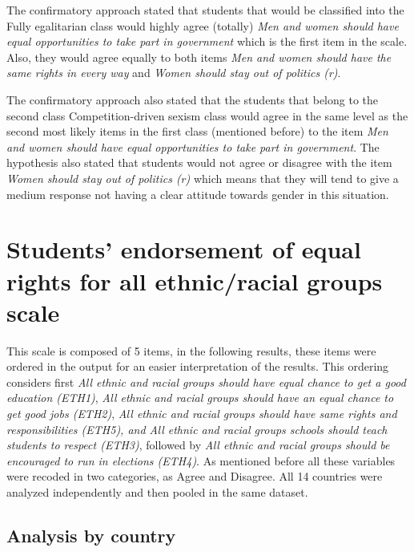 \documentclass[12pt,a4paper,oneside]{reedthesis}
\begin{document}
The confirmatory approach stated that students that would be classified into the Fully egalitarian class would highly agree (totally) \emph{Men and women should have equal opportunities to take part in government} which is the first item in the scale. Also, they would agree equally to both items \emph{Men and women should have the same rights in every way} and \emph{Women should stay out of politics (r)}.

The confirmatory approach also stated that the students that belong to the second class Competition-driven sexism class would agree in the same level as the second most likely items in the first class (mentioned before) to the item \emph{Men and women should have equal opportunities to take part in government}. The hypothesis also stated that students would not agree or disagree with the item \emph{Women should stay out of politics (r)} which means that they will tend to give a medium response not having a clear attitude towards gender in this situation.

\hypertarget{students-endorsement-of-equal-rights-for-all-ethnicracial-groups-scale}{%
\section{Students' endorsement of equal rights for all ethnic/racial groups scale}\label{students-endorsement-of-equal-rights-for-all-ethnicracial-groups-scale}}

This scale is composed of 5 items, in the following results, these items were ordered in the output for an easier interpretation of the results. This ordering considers first \emph{All ethnic and racial groups should have equal chance to get a good education (ETH1)}, \emph{All ethnic and racial groups should have an equal chance to get good jobs (ETH2)}, \emph{All ethnic and racial groups should have same rights and responsibilities (ETH5), and All ethnic and racial groups schools should teach students to respect (ETH3)}, followed by \emph{All ethnic and racial groups should be encouraged to run in elections (ETH4)}. As mentioned before all these variables were recoded in two categories, as Agree and Disagree. All 14 countries were analyzed independently and then pooled in the same dataset.

\hypertarget{analysis-by-country-1}{%
\subsection{Analysis by country}\label{analysis-by-country-1}}
\end{document}
